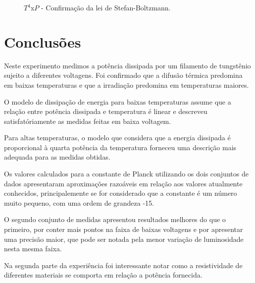 \documentclass[brazilian,12pt,a4paper,final]{article}
\begin{document}
\begin{figure}[htbp!]
  \caption{$T^4$x$P$ - Confirmação da lei de Stefan-Boltzmann.}
  \label{t4}
  \centering
\end{figure}

\section{Conclusões}
Neste experimento medimos a potência dissipada por um filamento de tungstênio
sujeito a diferentes voltagens. Foi confirmado que a difusão térmica predomina
em baixas temperaturas e que a irradiação predomina em temperaturas maiores.

O modelo de dissipação de energia para baixas temperaturas
assume que a relação entre potência dissipada e temperatura é linear
e descreveu satisfatóriamente as medidas feitas em baixa voltagem.

Para altas temperaturas, 
o modelo que considera que 
a energia dissipada é proporcional à quarta potência da temperatura 
forneceu uma descrição mais adequada para as medidas obtidas.

Os valores calculados para a constante de Planck utilizando os dois conjuntos
de dados apresentaram aproximações razoáveis em relação aos valores atualmente
conhecidos, principalemente se for considerado que a constante é um número
muito pequeno, com uma ordem de grandeza -15.

O segundo conjunto de medidas apresentou resultados melhores do que o 
primeiro, por conter mais pontos na faixa de baixas voltagens e por 
apresentar uma precisão maior, que pode ser notada pela menor variação
de luminosidade nesta mesma faixa.

Na segunda parte da experiência foi interessante notar como a resistividade de 
diferentes materiais se comporta em relação a potência fornecida.


\end{document}
